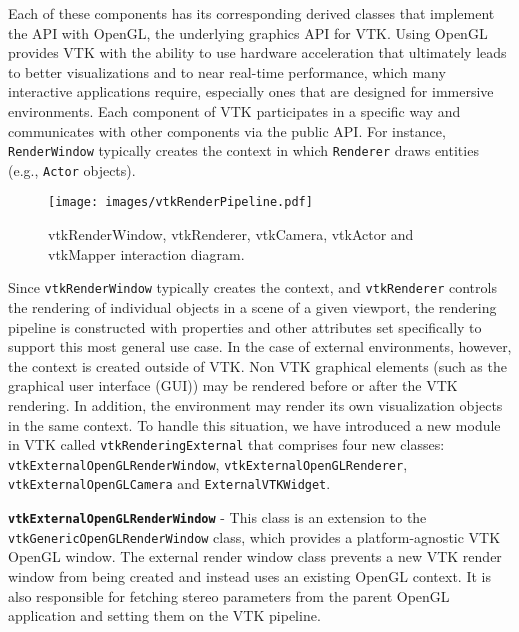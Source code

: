 Each of these components has its corresponding derived classes that implement the API with OpenGL, the underlying graphics API for VTK.
Using OpenGL provides VTK with the ability to use hardware acceleration that ultimately leads to better visualizations and to near real-time performance, which many interactive applications require, especially ones that are designed for immersive environments.
Each component of VTK participates in a specific way and communicates with other components via the public API.
For instance, \texttt{RenderWindow} typically creates the context in which
\texttt{Renderer} draws entities (e.g., \texttt{Actor} objects).

\begin{figure}[h!]
  \centering
  \texttt{[image: images/vtkRenderPipeline.pdf]}
  \caption{vtkRenderWindow, vtkRenderer, vtkCamera, vtkActor and vtkMapper interaction diagram.}
  \label{fig:vtkRenderPipeline}
\end{figure}

Since \texttt{vtkRenderWindow} typically creates the context, and \texttt{vtkRenderer} controls the rendering of individual objects in a scene of a given viewport, the rendering pipeline is constructed with properties and other attributes set specifically to support this most general use case.
In the case of external environments, however, the context is created outside of VTK. Non VTK graphical elements (such as the graphical user interface (GUI)) may be rendered before or after the VTK rendering.
In addition, the environment may render its own visualization objects in the same context.
To handle this situation, we have introduced a new module in VTK called \texttt{vtkRenderingExternal} that comprises four new classes: \texttt{vtkExternalOpenGLRenderWindow}, \texttt{vtkExternalOpenGLRenderer}, \texttt{vtkExternalOpenGLCamera} and \texttt{ExternalVTKWidget}. 

\textbf{\texttt{vtkExternalOpenGLRenderWindow}} - This class is an extension to
the \texttt{vtkGenericOpenGLRenderWindow} class, which provides a
platform-agnostic VTK OpenGL window.
The external render window class prevents a new VTK render window from being
created and instead uses an existing OpenGL context.
It is also responsible for fetching stereo parameters from the parent OpenGL
application and setting them on the VTK pipeline.

